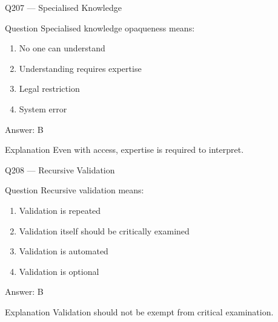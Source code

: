 \documentclass[aspectratio=169,8pt]{beamer}
\begin{document}
								\begin{frame}{Q207 --- Specialised Knowledge}
									\begin{block}{Question}
										Specialised knowledge opaqueness means:
										\begin{enumerate}
											\item No one can understand
											\item Understanding requires expertise
											\item Legal restriction
											\item System error
										\end{enumerate}
									\end{block}
									\begin{exampleblock}{Answer: B}\end{exampleblock}
									\begin{block}{Explanation}
										Even with access, expertise is required to interpret.
									\end{block}
								\end{frame}
								
								\begin{frame}{Q208 --- Recursive Validation}
									\begin{block}{Question}
										Recursive validation means:
										\begin{enumerate}
											\item Validation is repeated
											\item Validation itself should be critically examined
											\item Validation is automated
											\item Validation is optional
										\end{enumerate}
									\end{block}
									\begin{exampleblock}{Answer: B}\end{exampleblock}
									\begin{block}{Explanation}
										Validation should not be exempt from critical examination.
									\end{block}
								\end{frame}
								
\end{document}
